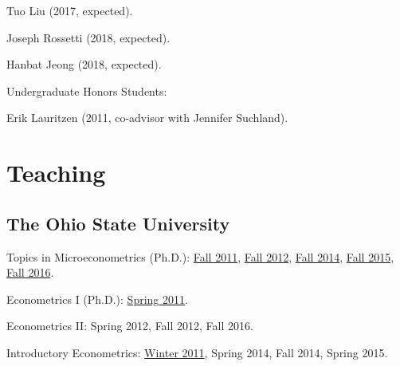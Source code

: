 \documentclass[10pt,letterpaper]{article}
\renewenvironment{itemize}{
  \begin{list}{}{
    \setlength{\leftmargin}{1.5em}
    \setlength{\itemsep}{0.25em}
    \setlength{\parskip}{0pt}
    \setlength{\parsep}{0.25em}
  }
}{
  \end{list}
}
\begin{document}
\begin{itemize}
\begin{itemize}
  \item Tuo Liu (2017, expected).
  \item Joseph Rossetti (2018, expected).
  \item Hanbat Jeong (2018, expected).
  \end{itemize}
\item Undergraduate Honors Students:
  \begin{itemize}
  \item Erik Lauritzen (2011, co-advisor with Jennifer Suchland).
  \end{itemize}
\end{itemize}

\section*{Teaching}

\subsection*{The Ohio State University}

\begin{itemize}
\item Topics in Microeconometrics (Ph.D.):
  \href{http://jblevins.org/courses/econ843f11/}{Fall 2011}, %
  \href{http://jblevins.org/courses/econ8833f12/}{Fall 2012}, %
  \href{http://jblevins.org/courses/econ8833f14/}{Fall 2014}, %
  \href{http://jblevins.org/courses/econ8833f15/}{Fall 2015}, %
  \href{http://jblevins.org/courses/econ8833f16/}{Fall 2016}. %
\item Econometrics I (Ph.D.):
  \href{http://jblevins.org/courses/econ741s11/}{Spring 2011}. %
\item Econometrics II:
  Spring 2012, %
  Fall 2012, %
  Fall 2016. %
\item Introductory Econometrics:
  \href{http://jblevins.org/courses/econ444w11/}{Winter 2011}, %
  Spring 2014, %
  Fall 2014, %
  Spring 2015. %
\end{itemize}
\end{document}
